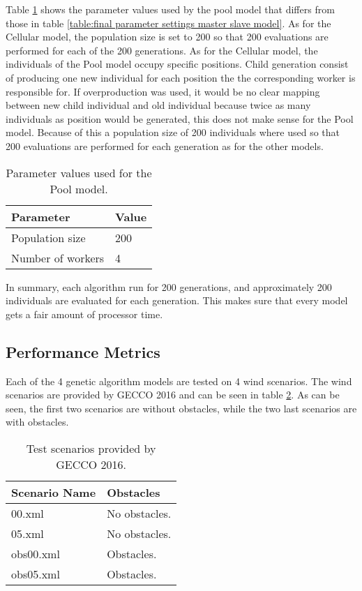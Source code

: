 \noindent Table \ref{table:final parameter settings pool model} shows the parameter values used by the pool model that differs from those in table \ref{table:final parameter settings master slave model}. As for the Cellular model, the population size is set to 200 so that 200 evaluations are performed for each of the 200 generations. As for the Cellular model, the individuals of the Pool model occupy specific positions. Child generation consist of producing one new individual for each position the the corresponding worker is responsible for. If overproduction was used, it would be no clear mapping between new child individual and old individual because twice as many individuals as position would be generated, this does not make sense for the Pool model. Because of this a population size of 200 individuals where used so that 200 evaluations are performed for each generation as for the other models.\\


\begin{table}[h!]
\centering
\caption{Parameter values used for the Pool model.}
\label{table:final parameter settings pool model}
\begin{tabular}{l|l}
\textbf{Parameter} & \textbf{Value} \\ 
\hline 
Population size & 200 \\  
Number of workers & 4 \\ 
\end{tabular}
\end{table}


\noindent In summary, each algorithm run for 200 generations, and approximately 200 individuals are evaluated for each generation. This makes sure that every model gets a fair amount of processor time.\\


\subsection{Performance Metrics}\label{subsection:performance metrics}
\noindent Each of the 4 genetic algorithm models are tested on 4 wind scenarios. The wind scenarios are provided by GECCO 2016 and can be seen in table \ref{table:scenario properties}. As can be seen, the first two scenarios are without obstacles, while the two last scenarios are with obstacles.\\

\begin{table}[h!]
\centering
\caption{Test scenarios provided by GECCO 2016.}
\label{table:scenario properties}
\begin{tabular}{l|l}
\textbf{Scenario Name} & \textbf{Obstacles} \\
\hline
00.xml            & No obstacles. \\
05.xml            & No obstacles. \\
obs00.xml         & Obstacles. \\
obs05.xml         & Obstacles. \\
\end{tabular}
\end{table}

